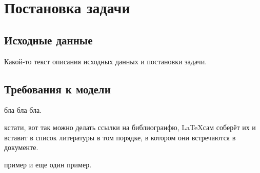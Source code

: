 \section{Постановка задачи}
\subsection{Исходные данные}
Какой-то текст описания исходных данных и постановки задачи.

\subsection{Требования к модели}
бла-бла-бла.

кстати, вот так \cite{Algorythm:WeilerProposal} можно делать ссылки на библиограифю,
\LaTeX сам соберёт их и вставит в список литературы в том порядке, в котором
они встречаются в документе.

пример \cite{Algorythm:Weiler}
и еще один \cite{Functions:Analytic} пример.
